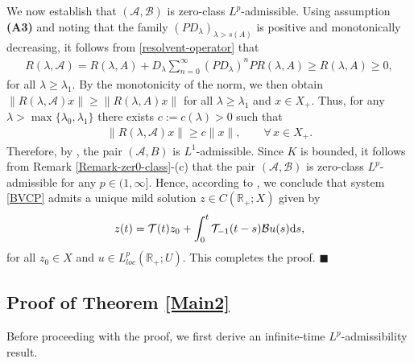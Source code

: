 \documentclass[onecolumn]{autart}
\def\calT{{\mathcal{T}}}
\def\calB{{\mathcal{B}}}
\def\calA{{\mathcal{A}}}
\numberwithin{equation}{section}
\begin{document}
		We now establish that $(\calA,\calB)$ is zero-class $L^p$-admissible. Using assumption {\bf (A3)} and noting that the family $(P D_\lambda)_{\lambda > s(A)}$ is positive and monotonically decreasing, it follows from \eqref{resolvent-operator} that
		\begin{align}\label{Resolvent}
			R(\lambda,\calA)
			= R(\lambda,A)+D_\lambda \sum_{n=0}^{\infty} (P D_\lambda)^n P R(\lambda, A)
			\ge R(\lambda, A) \ge 0,
		\end{align}
		for all $\lambda \ge \lambda_1$. By the monotonicity of the norm, we then obtain $\|R(\lambda, \calA)x\| \ge \|R(\lambda, A)x\|$ for all
		$\lambda \ge \lambda_1$ and $x \in X_+$. Thus, for any $\lambda > \max\{\lambda_0, \lambda_1\}$ there exists $c := c(\lambda) > 0$ such that
		\begin{align}\label{Inverse-F}
			\|R(\lambda, \calA)x\| \ge c \|x\|, \qquad \forall\, x \in X_+.
		\end{align}
		Therefore, by \cite[Thm. 2.7]{ELLC}, the pair $(\calA, B)$ is $L^1$-admissible. Since $K$ is bounded, it follows from Remark \ref{Remark-zer0-class}-(c) that the pair $(\calA, \calB)$ is zero-class $L^p$-admissible for any $p\in (1,\infty]$. Hence, according to \cite[Prop. 2.5]{JaNPS}, we conclude that system \eqref{BVCP} admits a unique mild solution $z \in  {C}(\mathbb{R}_+; X)$ given by
		\begin{align}\label{variation1}
			z(t) = \calT(t)z_0 + \int_{0}^{t} \calT_{-1}(t-s) \calB u(s) {\rm{d}}s,
		\end{align}
		for all $z_0 \in X$ and $u \in L_{loc}^p(\mathbb{R}_+; U)$. This completes the proof. \hfill $\blacksquare$\par
	
	
	\subsection{Proof of Theorem \ref{Main2}}
	Before proceeding with the proof, we first derive an infinite-time $L^p$-admissibility result.
	
\end{document}

